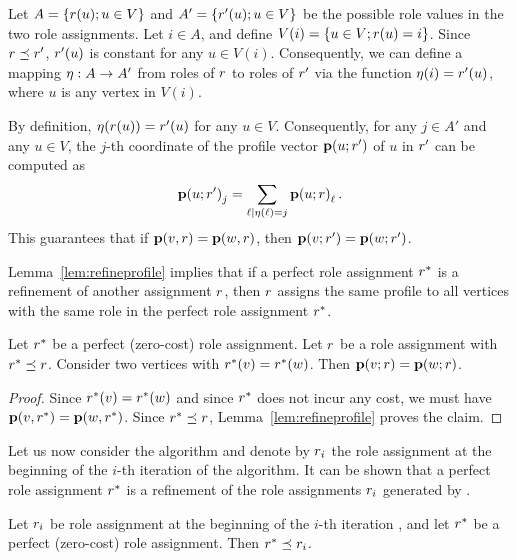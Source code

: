 \begin{IEEEproof}
Let $A = \left\{r(u); u \in V\right\}$ and $A' = \left\{r'(u); u \in V\right\}$ be the
possible role values in the two role assignments. 
Let $i \in A$, and define $V(i) = \left\{u \in V; r(u) = i\right\}$.
Since $r \preceq r'$, $r'(u)$ is constant for any $u \in V(i)$.
Consequently, we can define a mapping 
${\eta}:{A} \to {A'}$ 
from roles of $r$
to roles of $r'$ via the function
$\eta(i) = r'(u)$, where $u$ is any vertex in $V(i)$.

By definition, $\eta(r(u)) = r'(u)$ for any $u \in V$. 
Consequently,
for any $j \in A'$ and any $u \in V$, 
the $j$-th coordinate of the profile vector $\prof{u; \role'}$
of $u$ in $r'$ can be computed as  
\[
\prof{u; \role'}_j = \sum_{\ell\mid\eta(\ell) = j} \prof{u; \role}_\ell.
\]
This guarantees that if $\prof{v, \role} = \prof{w, \role}$, then $\prof{v; \role'} = \prof{w; \role'}$.
\end{IEEEproof}

Lemma~\ref{lem:refineprofile} implies 
that if a perfect role assignment $r^*$
is a refinement of another assignment $r$, 
then $r$ assigns the same profile to all vertices
with the same role in the perfect role assignment  $r^*$.

\begin{corollary}
\label{cor:refineprofile}
Let $r^*$ be a perfect (zero-cost) role assignment.
Let $r$ be a role assignment with $r^* \preceq r$.
Consider two vertices with $r^*(v) = r^*(w)$. 
Then $\prof{v; \role} = \prof{w; \role}$.
\end{corollary}

\begin{proof}
Since $r^*(v) = r^*(w)$ and 
since $r^*$ does not incur any cost, 
we must have $\prof{v, \role^*} = \prof{w, \role^*}$.
Since $r^* \preceq r$,
Lemma~\ref{lem:refineprofile} proves the claim.
\end{proof}

Let us now consider the {\algperfect} algorithm
and denote by $r_i$ the role assignment 
at the beginning of the $i$-th iteration of the algorithm.
It can be shown that a perfect role assignment  $r^*$ 
is a refinement of the role assignments $r_i$
generated by \algperfect.

\begin{lemma}
\label{lem:optimalrefine}
Let $r_i$ be role assignment 
at the beginning of the $i$-th iteration \algperfect, and
let $r^*$ be a perfect (zero-cost) role assignment. 
Then $r^* \preceq r_i$.
\end{lemma}


